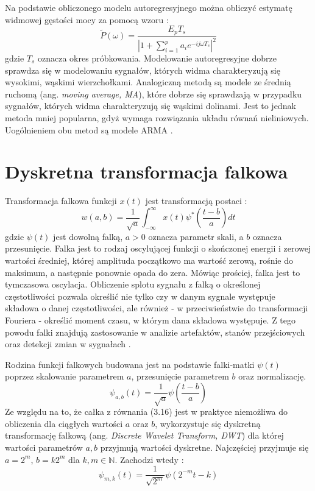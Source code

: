 \documentclass[notitlepage]{report}
\begin{document}
Na podstawie obliczonego modelu autoregresyjnego można obliczyć estymatę widmowej gęstości mocy za pomocą wzoru \cite{pardey}:
\begin{equation}
\tilde{P}(\omega) = \frac{E_pT_s}{|1+\sum_{i=1}^{p}a_ie^{-ij\omega T_s}|^2}
\end{equation}
gdzie $T_s$ oznacza okres próbkowania. Modelowanie autoregresyjne dobrze sprawdza się w modelowaniu sygnałów, których widma charakteryzują się wysokimi, wąskimi wierzchołkami. Analogiczną metodą są modele ze średnią ruchomą (ang. \textit{moving average, MA}), które dobrze się sprawdzają w przypadku sygnałów, których widma charakteryzują się wąskimi dolinami. Jest to jednak metoda mniej popularna, gdyż wymaga rozwiązania układu równań nieliniowych. Uogólnieniem obu metod są modele ARMA \cite{pardey} \cite{stoica}. 
 

\section{Dyskretna transformacja falkowa}
Transformacja falkowa funkcji $x(t)$ jest transformacją postaci \cite{addison}:
\begin{equation}
w(a,b) = \frac{1}{\sqrt{a}}\int_{-\infty}^{\infty}x(t)\psi^*(\frac{t-b}{a})dt
\end{equation}
gdzie $\psi(t)$ jest dowolną falką, $a > 0$ oznacza parametr skali, a $b$ oznacza przesunięcie. Falka jest to rodzaj oscylującej funkcji o skończonej energii i zerowej wartości średniej, której amplituda początkowo ma wartość zerową, rośnie do maksimum, a następnie ponownie opada do zera. Mówiąc prościej, falka jest to tymczasowa oscylacja. Obliczenie splotu sygnału z falką o określonej częstotliwości pozwala określić nie tylko czy w danym sygnale występuje składowa o danej częstotliwości, ale również - w przeciwieństwie do transformacji Fouriera - określić moment czasu, w którym dana składowa występuje. Z tego powodu falki znajdują zastosowanie w analizie artefaktów, stanów przejściowych oraz detekcji zmian w sygnałach \cite{addison}. 

Rodzina funkcji falkowych budowana jest na podstawie falki-matki $\psi(t)$ poprzez skalowanie parametrem $a$, przesunięcie parametrem $b$ oraz normalizację. 
\begin{equation}
\psi_{a,b}(t) = \frac{1}{\sqrt{a}}\psi(\frac{t-b}{a})
\end{equation} 
Ze względu na to, że całka z równania (3.16) jest w praktyce niemożliwa do obliczenia dla ciągłych wartości $a$ oraz $b$, wykorzystuje się dyskretną transformację falkową (ang. \textit{Discrete Wavelet Transform, DWT}) dla której wartości parametrów $a,b$ przyjmują wartości dyskretne. Najczęściej przyjmuje się $a = 2^m$, $b = k2^m$ dla $k,m \in \mathbb{N}$. Zachodzi wtedy \cite{addison}:
\begin{equation}
\psi_{m,k}(t) = \frac{1}{\sqrt{2^m}}\psi(2^{-m}t-k)
\end{equation}
\end{document}
